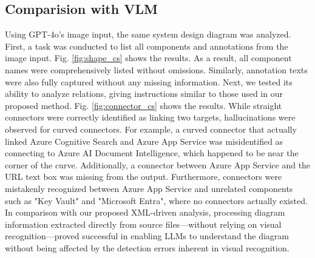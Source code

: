 \subsection{Comparision with VLM}
\label{sec:result2}
Using GPT-4o’s image input, the same system design diagram was analyzed.
First, a task was conducted to list all components and annotations from the image input.  Fig. \ref{fig:shape_cs} shows the results.  As a result, all component names were comprehensively listed without omissions. Similarly, annotation texts were also fully captured without any missing information. Next, we tested its ability to analyze relations, giving instructions similar to those used in our proposed method.  Fig. \ref{fig:connector_cs} shows the results. While straight connectors were correctly identified as linking two targets, hallucinations were observed for curved connectors. For example, a curved connector that actually linked Azure Cognitive Search and Azure App Service was misidentified as connecting to Azure AI Document Intelligence, which happened to be near the corner of the curve. Additionally, a connector between Azure App Service and the URL text box was missing from the output. Furthermore, connectors were mistakenly recognized between Azure App Service and unrelated components such as "Key Vault" and "Microsoft Entra", where no connectors actually existed.
In comparison with our proposed XML-driven analysis, processing diagram information extracted directly from source files—without relying on visual recognition—proved successful in enabling LLMs to understand the diagram without being affected by the detection errors inherent in visual recognition.

